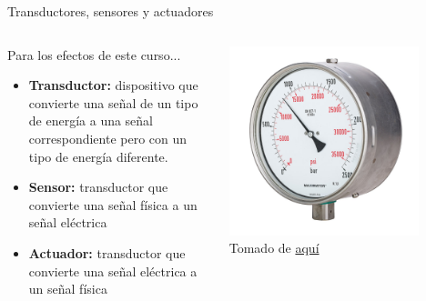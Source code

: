 \documentclass[aspectratio=169]{beamer}
\begin{document}
\begin{frame}{Transductores, sensores y actuadores}
    \begin{columns}[c, onlytextwidth]
        \begin{column}{0.6\textwidth}
        Para los efectos de este curso...\\[8pt]
        \begin{itemize}
            \item \textbf{Transductor:} dispositivo que convierte una señal de un tipo de energía a una señal correspondiente pero con un tipo de energía diferente.
            \item \textbf{Sensor:} transductor que convierte una señal física a un señal eléctrica
            \item \textbf{Actuador:} transductor que convierte una señal eléctrica a un señal física
        \end{itemize}
        \end{column}
        \begin{column}{0.4\textwidth}
            \begin{center}
               \includegraphics[width=0.8\textwidth]{fig/bourdon.jpg}\\
               \tiny{Tomado de \href{https://upload.wikimedia.org/wikipedia/commons/thumb/7/74/MAXIMATOR-High-Pressure-Manometer-01a.jpg/1200px-MAXIMATOR-High-Pressure-Manometer-01a.jpg}{aquí}}
            \end{center}
        \end{column}
    \end{columns}
\end{frame}
\end{document}
